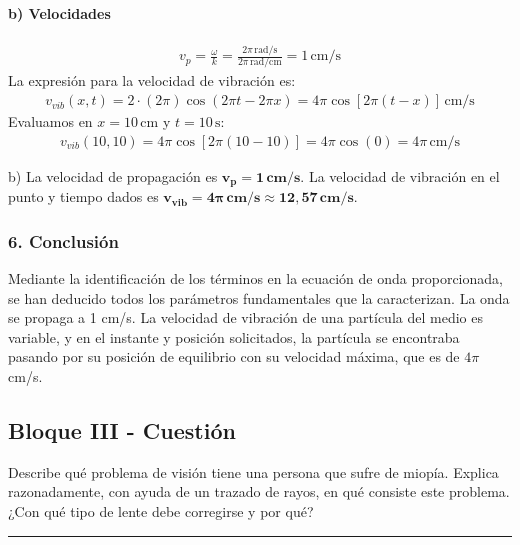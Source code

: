 \paragraph{b) Velocidades}
\begin{gather}
    v_p = \frac{\omega}{k} = \frac{2\pi\,\text{rad/s}}{2\pi\,\text{rad/cm}} = 1\,\text{cm/s}
\end{gather}
La expresión para la velocidad de vibración es:
\begin{gather}
    v_{vib}(x,t) = 2 \cdot (2\pi)\cos(2\pi t - 2\pi x) = 4\pi\cos[2\pi(t-x)]\,\text{cm/s}
\end{gather}
Evaluamos en $x=10\,\text{cm}$ y $t=10\,\text{s}$:
\begin{gather}
    v_{vib}(10, 10) = 4\pi\cos[2\pi(10-10)] = 4\pi\cos(0) = 4\pi\,\text{cm/s}
\end{gather}
\begin{cajaresultado}
b) La velocidad de propagación es $\boldsymbol{v_p = 1\,\textbf{cm/s}}$. La velocidad de vibración en el punto y tiempo dados es $\boldsymbol{v_{vib} = 4\pi\,\textbf{cm/s} \approx 12,57\,\textbf{cm/s}}$.
\end{cajaresultado}

\subsubsection*{6. Conclusión}
\begin{cajaconclusion}
Mediante la identificación de los términos en la ecuación de onda proporcionada, se han deducido todos los parámetros fundamentales que la caracterizan. La onda se propaga a 1 cm/s. La velocidad de vibración de una partícula del medio es variable, y en el instante y posición solicitados, la partícula se encontraba pasando por su posición de equilibrio con su velocidad máxima, que es de $4\pi$ cm/s.
\end{cajaconclusion}

\newpage

\subsection{Bloque III - Cuestión}
\label{subsec:B3_2014_jul_ext}

\begin{cajaenunciado}
Describe qué problema de visión tiene una persona que sufre de miopía. Explica razonadamente, con ayuda de un trazado de rayos, en qué consiste este problema. ¿Con qué tipo de lente debe corregirse y por qué? 
\end{cajaenunciado}
\hrule

